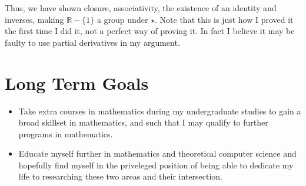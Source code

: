 \documentclass{article}
\begin{document}
Thus, we have shown closure, associativity, the existence of an identity and inverses, making \( \mathbb{R} - \{1\}\) a group under \( \star \).
Note that this is just how I proved it the first time I did it, not a perfect way of proving it. In fact I believe it may be faulty to use partial derivatives in my argument.

\break
\section{Long Term Goals}
\begin{itemize}
  \item Take extra courses in mathematics during my undergraduate studies to gain a broad skillset in mathematics, and such that I may qualify to further programs in mathematics. 
  \item Educate myself further in mathematics and theoretical computer science and hopefully find myself in the priveleged position of being able to dedicate my life to researching these two areas and their intersection.
\end{itemize}
\end{document}
